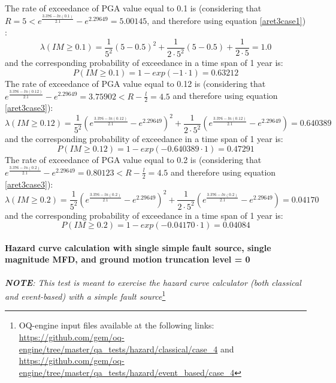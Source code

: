 The rate of exceedance of PGA value equal to 0.1 is (considering that  $R = 5 < e^{\frac{3.376 - ln(0.1)}{2.1}} - e^{2.29649} = 5.00145$, and therefore using
equation \ref{aret3case1}) :
\begin{equation}
\lambda(IM \geq 0.1) = \frac{1}{5^{2}}(5 - 0.5)^{2} + \frac{1}{2\cdot5^{2}}(5 - 0.5) + \frac{1}{2\cdot5} = 1.0
\end{equation}
and the corresponding probability of exceedance in a time span of 1 year is:
\begin{equation}
P(IM \geq 0.1) = 1 - exp(-1 \cdot 1) = 0.63212
\end{equation}
The rate of exceedance of PGA value equal to 0.12 is (considering that $e^{\frac{3.376 - ln(0.12)}{2.1}} - e^{2.29649} = 3.75902 < R - \frac{l}{2} = 4.5$ and therefore using equation \ref{aret3case3}):
\begin{equation}
\lambda(IM \geq 0.12) = \frac{1}{5^{2}} (e^{\frac{3.376 - ln(0.12)}{2.1}} - e^{2.29649})^{2} + \frac{1}{2\cdot 5^{2}}(e^{\frac{3.376 - ln(0.12)}{2.1}} - e^{2.29649}) = 0.640389
\end{equation}
and the corresponding probability of exceedance in a time span of 1 year is:
\begin{equation}
P(IM \geq 0.12) = 1 - exp(-0.640389 \cdot 1) = 0.47291
\end{equation}
The rate of exceedance of PGA value equal to 0.2 is (considering that $e^{\frac{3.376 - ln(0.2)}{2.1}} - e^{2.29649} = 0.80123 < R - \frac{l}{2} = 4.5$ and therefore using equation \ref{aret3case3}):
\begin{equation}
\lambda(IM \geq 0.2) = \frac{1}{5^{2}} (e^{\frac{3.376 - ln(0.2)}{2.1}} - e^{2.29649})^{2} + \frac{1}{2\cdot 5^{2}}(e^{\frac{3.376 - ln(0.2)}{2.1}} - e^{2.29649}) = 0.04170
\end{equation}
and the corresponding probability of exceedance in a time span of 1 year is:
\begin{equation}
P(IM \geq 0.2) = 1 - exp(-0.04170 \cdot 1) = 0.04084
\end{equation}
%
\clearpage
%
\paragraph{Hazard curve calculation with single simple
fault source, single magnitude MFD, and ground motion truncation level = 0} 
\textit{\textbf{NOTE}:
This test is meant to exercise the hazard curve calculator (both classical and
event-based) with a simple fault source}\footnote{
    OQ-engine input files available at the following links:
    \url{https://github.com/gem/oq-engine/tree/master/qa_tests/hazard/classical/case_4}
    and 
    \url{https://github.com/gem/oq-engine/tree/master/qa_tests/hazard/event_based/case_4}}

